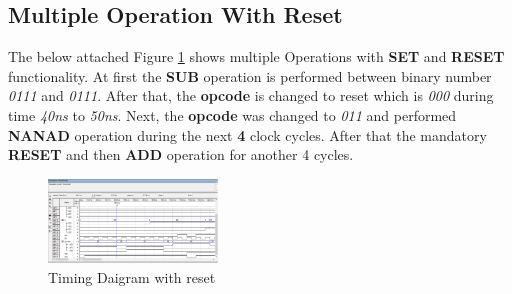 \subsection{Multiple Operation With Reset}\label{subsec:multiple-operation-with-reset}
The below attached Figure \ref{fig:multiple operation} shows multiple Operations with \textbf{SET} and \textbf{RESET} functionality.
At first the \textbf{SUB} operation is performed between binary number \textit{0111} and \textit{0111}.
After that, the \textbf{opcode} is changed to reset which is \textit{000} during time \textit{40ns} to \textit{50ns}.
Next, the \textbf{opcode} was changed to \textit{011} and performed \textbf{NANAD} operation during the next \textbf{4} clock cycles.
After that the mandatory \textbf{RESET} and then \textbf{ADD} operation for another 4 cycles.
\begin{figure}[H]
    \begin{center}
        \includegraphics[width = 0.4\textwidth]{figures/three_operation_together_sub_nand_add_with_reset}
    \end{center}
    \caption{Timing Daigram with reset}
    \label{fig:multiple operation}
\end{figure}
